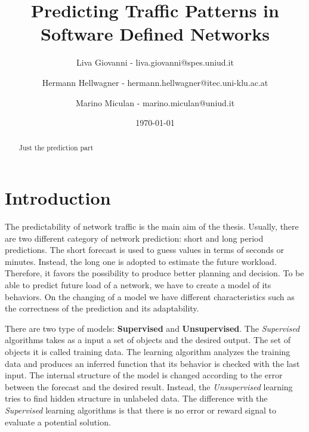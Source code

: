 \documentclass[12pt]{article}
\title{Predicting Traffic Patterns in\\ Software Defined Networks}
\author{
	Liva Giovanni - liva.giovanni@spes.uniud.it
	\and
	Hermann Hellwagner - hermann.hellwagner@itec.uni-klu.ac.at
	\and
	Marino Miculan - marino.miculan@uniud.it
}
\date{\today}
\begin{document}
	
\maketitle

\begin{abstract}
	Just the prediction part
\end{abstract}

\newpage

\section{Introduction}
The predictability of network traffic is the main aim of the thesis. 
Usually, there are two different category of network prediction: short and long period predictions.
The short forecast is used to guess values in terms of seconds or minutes. 
Instead, the long one is adopted to estimate the future workload. 
Therefore, it favors the possibility to produce better planning and decision.
To be able to predict future load of a network, we have to create a model of its behaviors. 
On the changing of a model we have different characteristics such as the correctness of the prediction and its adaptability.


There are two type of models: \textbf{Supervised} and \textbf{Unsupervised}.
The \textit{Supervised} algorithms takes as a input a set of objects and the desired output. 
The set of objects it is called training data.
The learning algorithm analyzes the training data and produces an inferred function that its behavior is checked with the last input. 
The internal structure of the model is changed according to the error between the forecast and the desired result.
Instead, the \textit{Unsupervised} learning tries to find hidden structure in unlabeled data. 
The difference with the \textit{Supervised} learning algorithms is that there is no error or reward signal to evaluate a potential solution.
\end{document}

